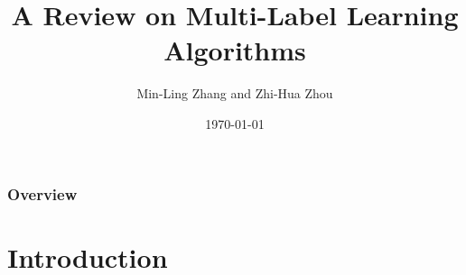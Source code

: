 \documentclass{beamer}
\title[Large-Scale Data Analysis Techniques]{A Review on Multi-Label Learning Algorithms} %
\author[Sissy Themeli, Nikiforos Pittaras]{Min-Ling Zhang and Zhi-Hua Zhou} %
\institute[DI-UOA] %
{
	IEEE TRANSACTIONS ON KNOWLEDGE AND DATA ENGINEERING\\ %
	\medskip
}
\date{\today} %
\begin{document}
	
	\begin{frame}
	\titlepage %
\end{frame}

\begin{frame}
\frametitle{Overview} %
\tableofcontents %
\end{frame}


\section{Introduction} %
\end{document}
